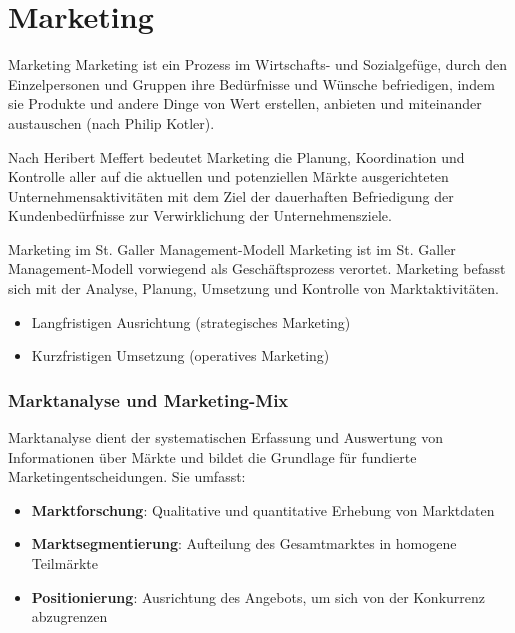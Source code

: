 \section{Marketing}

\begin{definition}{Marketing} \small
Marketing ist ein Prozess im Wirtschafts- und Sozialgefüge, durch den Einzelpersonen und Gruppen ihre Bedürfnisse und Wünsche befriedigen, indem sie Produkte und andere Dinge von Wert erstellen, anbieten und miteinander austauschen (nach Philip Kotler).

Nach Heribert Meffert bedeutet Marketing die Planung, Koordination und Kontrolle aller auf die aktuellen und potenziellen Märkte ausgerichteten Unternehmensaktivitäten mit dem Ziel der dauerhaften Befriedigung der Kundenbedürfnisse zur Verwirklichung der Unternehmensziele.
\end{definition}

\begin{concept}{Marketing im St. Galler Management-Modell} \small
Marketing ist im St. Galler Management-Modell vorwiegend als Geschäftsprozess verortet. Marketing befasst sich mit der Analyse, Planung, Umsetzung und Kontrolle von Marktaktivitäten.
\begin{itemize}
    \item Langfristigen Ausrichtung (strategisches Marketing)
    \item Kurzfristigen Umsetzung (operatives Marketing)
\end{itemize}
\end{concept}

\subsubsection{Marktanalyse und Marketing-Mix}

\begin{KR}{Marktanalyse}
    dient der systematischen Erfassung und Auswertung von Informationen über Märkte und bildet die Grundlage für fundierte Marketingentscheidungen. Sie umfasst:
\begin{itemize}
    \item \textbf{Marktforschung}: Qualitative und quantitative Erhebung von Marktdaten
    \item \textbf{Marktsegmentierung}: Aufteilung des Gesamtmarktes in homogene Teilmärkte
    \item \textbf{Positionierung}: Ausrichtung des Angebots, um sich von der Konkurrenz abzugrenzen
\end{itemize}
\end{KR}

